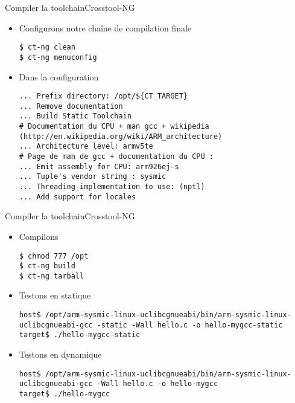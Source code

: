 \begin{frame}[fragile=singleslide]{Compiler la toolchain}{Crosstool-NG}
  \begin{itemize}
  \item Configurons notre chaîne de compilation finale
    \begin{lstlisting}
$ ct-ng clean 
$ ct-ng menuconfig
       \end{lstlisting}
     \item Dans la configuration
       \begin{lstlisting}
... Prefix directory: /opt/${CT_TARGET}
... Remove documentation 
... Build Static Toolchain
# Documentation du CPU + man gcc + wikipedia (http://en.wikipedia.org/wiki/ARM_architecture)
... Architecture level: armv5te
# Page de man de gcc + documentation du CPU :
... Emit assembly for CPU: arm926ej-s
... Tuple's vendor string : sysmic
... Threading implementation to use: (nptl) 
... Add support for locales
       \end{lstlisting}
  \end{itemize}
\end{frame}

\begin{frame}[fragile=singleslide]{Compiler la toolchain}{Crosstool-NG}
  \begin{itemize}
     \item Compilons
       \begin{lstlisting}
$ chmod 777 /opt
$ ct-ng build
$ ct-ng tarball
       \end{lstlisting}
     \item Testons en statique
       \begin{lstlisting}[basicstyle=\ttfamily\scriptsize\color{colBasic}]
host$ /opt/arm-sysmic-linux-uclibcgnueabi/bin/arm-sysmic-linux-uclibcgnueabi-gcc -static -Wall hello.c -o hello-mygcc-static
target$ ./hello-mygcc-static
       \end{lstlisting}
     \item Testons en dynamique
       \begin{lstlisting}[basicstyle=\ttfamily\scriptsize\color{colBasic}]
host$ /opt/arm-sysmic-linux-uclibcgnueabi/bin/arm-sysmic-linux-uclibcgnueabi-gcc -Wall hello.c -o hello-mygcc
target$ ./hello-mygcc
	\end{lstlisting}
  \end{itemize}
\end{frame}


